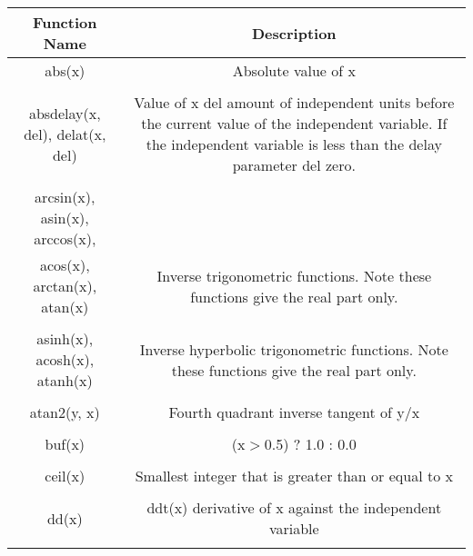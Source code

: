 \begin{longtable}{c c}

\hline\hline %
Function Name & Description \\ [0.5ex] %
\hline %
abs(x) & Absolute value of x \\ \\ %

absdelay(x, del), delat(x, del) & \begin{minipage}{20em}
Value of x del amount of independent units before the current value of the independent variable. If the independent variable is less than the delay parameter del zero.
\end{minipage}\\ \\

arcsin(x), asin(x), arccos(x),\\ 
acos(x), arctan(x), atan(x) & \begin{minipage}{20em}
Inverse trigonometric functions. Note these functions give the real part only.
\end{minipage}\\ \\

asinh(x), acosh(x), atanh(x) & \begin{minipage}{20em}
Inverse hyperbolic trigonometric functions. Note these functions give the real part only.
\end{minipage}\\ \\

atan2(y, x) & \begin{minipage}{20em}
Fourth quadrant inverse tangent of y$/$x
\end{minipage}\\ \\

buf(x) & \begin{minipage}{20em}
(x$>$0.5) ? 1.0 : 0.0
\end{minipage}\\ \\

ceil(x) & \begin{minipage}{20em}
Smallest integer that is greater than or equal to x
\end{minipage}\\ \\

dd(x) & \begin{minipage}{20em}
ddt(x) derivative of x against the independent variable
\end{minipage}\\ \\


\end{longtable}
